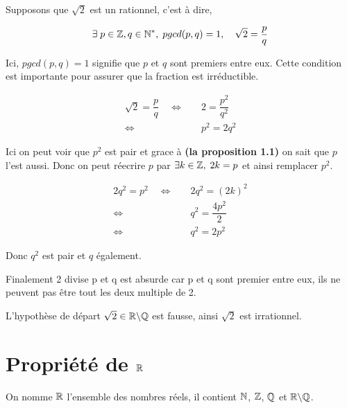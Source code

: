 \documentclass[a4paper, 12pt]{article}
\begin{document}
\begin{demonstration}
    Supposons que $\sqrt{2}$ est un rationnel, c'est à dire,
    
    \begin{align*}
        \exists \; p \in \mathbb{Z}, q \in \mathbb{N}^*, \; pgcd(p, q) = 1, \quad \sqrt{2}=\dfrac{p}{q}
    \end{align*}

    Ici, $pgcd(p, q) = 1$ signifie que $p$ et $q$ sont premiers entre eux. Cette condition est importante pour assurer que la fraction est irréductible.


    \begin{align*}
        \sqrt{2} = \dfrac{p}{q} \quad \iff& \quad 2 = \dfrac{p^2}{q^2} \\
        \iff& \quad p^2 = 2q^2
    \end{align*}

    \vspace{0.5em}
    Ici on peut voir que $p^2$ est pair et grace à \textbf{(la proposition 1.1)} on sait que $p$ l'est aussi.
    Donc on peut réecrire $p$ par $\exists k \in \mathbb{Z}, \; 2k = p$
    et ainsi remplacer $p^2$.

    \nobreak

    \begin{align*}
        2q^2 = p^2 \quad \iff& \quad 2q^2 = (2k)^2 \\
        \iff& \quad q^2 = \dfrac{4p^2}{2} \\
        \iff& \quad q^2 = 2p^2
    \end{align*}

    Donc $q^2$ est pair et $q$ également.

    Finalement 2 divise p et q est absurde car p et q sont premier entre eux, ils ne peuvent pas être tout les deux multiple de 2.
    
    \begin{rdem}
        L'hypothèse de départ $\sqrt{2} \in \mathbb{R} \backslash \mathbb{Q}$ est fausse, ainsi $\sqrt{2}$ est irrationnel.
    \end{rdem}

\end{demonstration}

\section{Propriété de $\mathbb{R}$}

On nomme $\mathbb{R}$ l'ensemble des nombres réels, il contient $\mathbb{N}$, $\mathbb{Z}$, $\mathbb{Q}$ et $\mathbb{R} \backslash \mathbb{Q}$.
\end{document}
